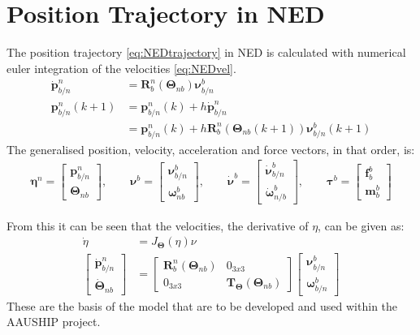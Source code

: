 \section{Position Trajectory in \acs{NED}}
The position trajectory \vref{eq:NEDtrajectory} in \ac{NED} is calculated with numerical euler integration of the velocities \vref{eq:NEDvel}.
\begin{subequations}
\begin{align}
\dot{\mathbf{p}}^n _{b/n} &= \mathbf{R}^n _b (\boldsymbol{\Theta}_{nb}) \boldsymbol{\nu}^b _{b/n} \label{eq:NEDvel}\\
\mathbf{p}^n _{b/n}(k+1) &= \mathbf{p}^n _{b/n}(k) + h \dot{\mathbf{p}}^n _{b/n} \label{eq:NEDtrajectory} \\
&= \mathbf{p}^n _{b/n}(k) + h \mathbf{R}^n _b
(\boldsymbol{\Theta}_{nb}(k+1)) \boldsymbol{\nu}^b _{b/n}(k+1) 
\end{align}
\end{subequations}
The generalised position, velocity, acceleration and force vectors, in that order, is:
\begin{align}
\boldsymbol{\eta}^n =
\begin{bmatrix}
\mathbf{p}^n _{b/n}\\\boldsymbol{\Theta}_{nb}
\end{bmatrix},\qquad
\boldsymbol{\nu}^b =
\begin{bmatrix}
\boldsymbol{\nu}^b _{b/n}\\\boldsymbol{\omega}^b _{nb}
\end{bmatrix},\qquad
\dot{\boldsymbol{\nu}}^b =
\begin{bmatrix}
\dot{\boldsymbol{\nu}}^b _{b/n}\\\dot{\boldsymbol{\omega}}^b _{n/b}
\end{bmatrix},\qquad
\boldsymbol{\tau}^b =
\begin{bmatrix}
\mathbf{f}^b _b\\\mathbf{m}^b _b
\end{bmatrix}
\end{align}

From this it can be seen that the velocities, the derivative of $\eta$, can be given as:
\begin{align}
\dot \eta &= J_{\boldsymbol{\Theta}}(\eta)\nu\\
\begin{bmatrix}
\dot{\mathbf{p}}^n _{b/n}\\\dot{\boldsymbol{\Theta}}_{nb}
\end{bmatrix}
&=
\begin{bmatrix}
\boldsymbol{R}^n_b(\boldsymbol{\Theta}_{nb}) & 0_{3x3} \\
0_{3x3} & \boldsymbol{T}_{\boldsymbol{\Theta}}(\boldsymbol{\Theta}_{nb})
\end{bmatrix}
\begin{bmatrix}
\boldsymbol{\nu}^b_{b/n}\\\boldsymbol{\omega}^b_{b/n}
\end{bmatrix}
\end{align}
These are the basis of the model that are to be developed and used within the AAUSHIP project.

